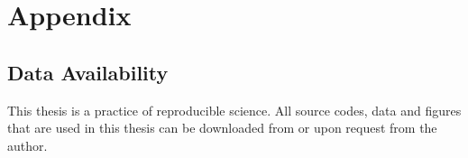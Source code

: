 \chapter{Appendix}
\label{ch:appendix}

\section*{Data Availability}

This thesis is a practice of reproducible science. All source codes,
data and figures that are used in this thesis can be downloaded from
  or upon request from the author.

